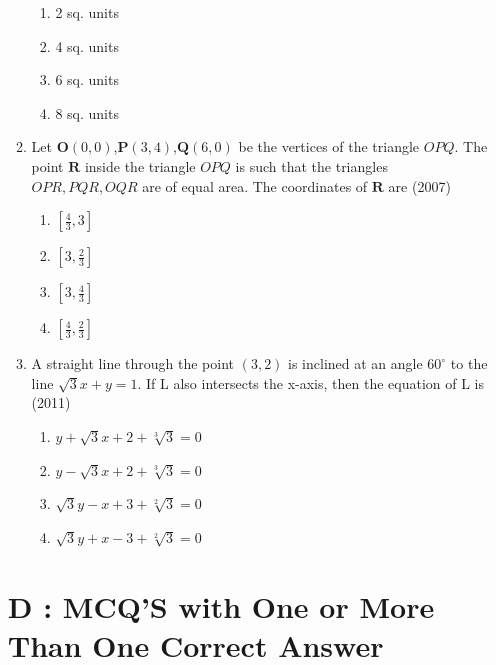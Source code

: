 \documentclass[12pt]{article}
\providecommand{\sbrak}[1]{\ensuremath{{}\left[#1\right]}}
\let\vec\mathbf
\begin{document}
\begin{enumerate}
\begin{enumerate}
\begin{enumerate}
\item 2 sq. units  
\item 4 sq. units 
\item 6 sq. units    
\item 8 sq. units
\end{enumerate}
\item Let $\vec{O}(0,0)$,$\vec{P}(3,4)$,$\vec{Q}(6,0)$ be the vertices of the triangle $OPQ$. The point $\vec{R}$ inside the triangle $OPQ$ is such that the triangles $OPR,PQR,OQR$ are of equal area. The coordinates of $\vec{R}$ are   (2007)
\begin{enumerate}
\item $\sbrak{\frac{4}{3}, 3}$   
\item $\sbrak{3,\frac{2}{3}}$  
\item $\sbrak{3,\frac{4}{3}}$  
\item $\sbrak{\frac{4}{3},\frac{2}{3}}$
\end{enumerate}
\item A straight line through the point $(3,2)$ is inclined at an angle $60^\circ$  to the line $\sqrt{3}x+y=1$. If L also intersects the x-axis, then the equation of L is   (2011)
\begin{enumerate}
\item $y+\sqrt{3}x+2+\sqrt[3]{3}=0$
\item $y-\sqrt{3}x+2+\sqrt[3]{3}=0$ 
\item $\sqrt{3}y-x+3+\sqrt[2]{3}=0$  
\item $\sqrt{3}y+x-3+\sqrt[2]{3}=0$
\end{enumerate}
\iffalse
\end{enumerate}
\section*{D  :  MCQ'S with One or More Than One Correct Answer}


\end{enumerate}
\end{document}
